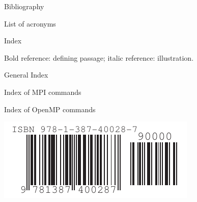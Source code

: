 \documentclass[11pt,letterpaper,twoside,openany]{boek3}
\begin{document}

 {Bibliography}



\vfill\pagebreak

 {List of acronyms}

\def\acitem#1#2{\item[#1] #2}
\def\acitemi#1#2#3{\item[#1]{#2}\index{#1|see{#3}}}

\begin{multicols}{2}
\begin{description}

\end{description}
\end{multicols}
\vfill\pagebreak

 {Index}


Bold reference: defining passage; italic reference: illustration.

 {General Index}

\begin{multicols*}{2}
\printindex
\end{multicols*}

 {Index of MPI commands}

\begin{multicols*}{2}
\printindex[mpi]
\end{multicols*}

 {Index of OpenMP commands}

\begin{multicols*}{2}
\printindex[omp]
\end{multicols*}

\hbox{}\vfill
\includegraphics{isbn_barcode}

\closeout\chapterlist
\end{document}
